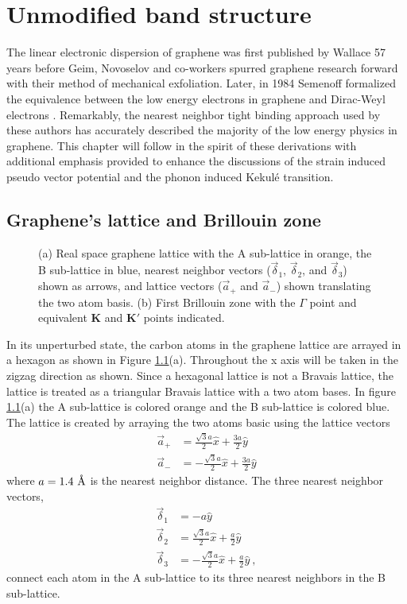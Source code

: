 \chapter{Unmodified band structure\label{chap:TB}}

The linear electronic dispersion of graphene was first published by Wallace\cite{Wallace1947} 57 years before Geim, Novoselov and co-workers spurred graphene research forward with their method of mechanical exfoliation\cite{Novoselov2004}.
Later, in 1984 Semenoff formalized the equivalence between the low energy electrons in graphene and Dirac-Weyl electrons \cite{Semenoff1984}.
Remarkably, the nearest neighbor tight binding approach used by these authors has accurately described the majority of the low energy physics in graphene.
This chapter will follow in the spirit of these derivations with additional emphasis provided to enhance the discussions of the strain induced pseudo vector potential and the phonon induced Kekul\'e transition.

\section{Graphene's lattice and Brillouin zone}
\begin{figure}
	\begin{center}
	
	\end{center}
	\caption{\label{fig:TB:geometry} (a) Real space graphene lattice with the A sub-lattice in orange, the B sub-lattice in blue, nearest neighbor vectors ($\vec \delta_1$, $\vec \delta_2$, and $\vec \delta_3$) shown as arrows, and lattice vectors ($\vec a_+$ and $\vec a_-$) shown translating the two atom basis. (b) First Brillouin zone with the $\Gamma$ point and equivalent $\bm{K}$ and $\bm{K'}$ points indicated.}
\end{figure}

In its unperturbed state, the carbon atoms in the graphene lattice are arrayed in a hexagon as shown in Figure \ref{fig:TB:geometry}(a).
Throughout the x axis will be taken in the zigzag direction as shown.
Since a hexagonal lattice is not a Bravais lattice, the lattice is treated as a triangular Bravais lattice with a two atom bases.
In figure \ref{fig:TB:geometry}(a) the A sub-lattice is colored orange and the B sub-lattice is colored blue.
The lattice is created by arraying the two atoms basic using the lattice vectors 
\begin{align*}
	\vec{a}_+&= \frac{\sqrt{3}a}{2} \hat{x} + \frac{3a}{2} \hat{y} \\
	\vec{a}_-&=-\frac{\sqrt{3}a}{2} \hat{x} + \frac{3a}{2} \hat{y}
\end{align*}
where $a=1.4 \ \textup{\AA}$ is the nearest neighbor distance.
The three nearest neighbor vectors,
\begin{align*}
	\vec \delta_1&=-a \hat{y} \\
	\vec \delta_2&= \frac{\sqrt{3} a}{2}\hat{x}+\frac{a}{2}\hat{y}\\
	\vec \delta_3&=-\frac{\sqrt{3} a}{2}\hat{x}+\frac{a}{2}\hat{y} \ ,
\end{align*}
connect each atom in the A sub-lattice to its three nearest neighbors in the B sub-lattice.

